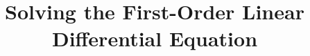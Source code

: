 \documentclass{beamer}
\title[Section 2.2]{Solving the First-Order Linear Differential Equation}
\begin{document}
\begin{frame}
\titlepage
\end{frame}
\end{document}

